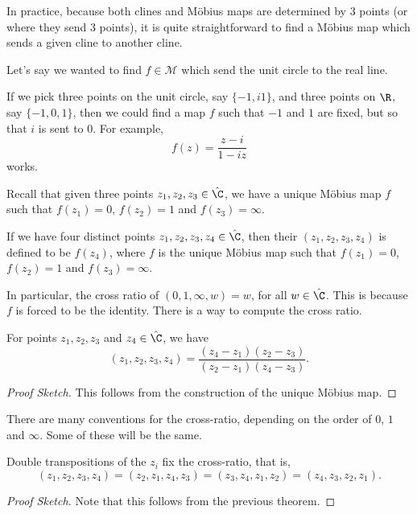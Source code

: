 In practice, because both clines and Möbius maps are determined by 3 points (or where they send 3 points), it is quite straightforward to find a Möbius map which sends a given cline to another cline.

\begin{example}
	Let's say we wanted to find $f \in \mathcal{M}$ which send the unit circle to the real line.

	If we pick three points on the unit circle, say $\{-1, i 1\}$, and three points on $\R$, say $\{-1, 0, 1\}$, then we could find a map $f$ such that $-1$ and $1$ are fixed, but so that $i$ is sent to $0$. For example,
	$$
	f(z) = \frac{z - i}{1 - iz}
	$$
	works.
\end{example}


Recall that given three points $z_1, z_2, z_3 \in \hat{\C}$, we have a unique Möbius map $f$ such that $f(z_1) = 0$, $f(z_2) = 1$ and $f(z_3) = \infty$.

\begin{definition}
	If we have four distinct points $z_1, z_2, z_3, z_4 \in \hat{\C}$, then their  $(z_1, z_2, z_3, z_4)$ is defined to be $f(z_4)$, where $f$ is the unique Möbius map such that $f(z_1) = 0$, $f(z_2) = 1$ and $f(z_3) = \infty$.
\end{definition}

In particular, the cross ratio of $(0, 1, \infty, w) = w$, for all $w \in \hat{\C}$. This is because $f$ is forced to be the identity. There is a way to compute the cross ratio.

\begin{theorem}
For points $z_1, z_2, z_3$ and $z_4 \in \hat{\C}$, we have
$$
(z_1, z_2 , z_3, z_4) = \frac{(z_4 - z_1)(z_2 - z_3)}{(z_2 - z_1)(z_4 - z_3)}.
$$
\end{theorem}
\begin{proof}[Proof Sketch]
This follows from the construction of the unique Möbius map.
\end{proof}

\begin{remark}
	There are many conventions for the cross-ratio, depending on the order of $0$, $1$ and $\infty$. Some of these will be the same.
\end{remark}

\begin{proposition}
	Double transpositions of the $z_i$ fix the cross-ratio, that is,
	$$
	(z_1, z_2, z_3, z_4) = (z_2, z_1, z_4, z_3) = (z_3, z_4, z_1, z_2) = (z_4, z_3, z_2, z_1).
	$$
\end{proposition}
\begin{proof}[Proof Sketch]
	Note that this follows from the previous theorem.
\end{proof}

